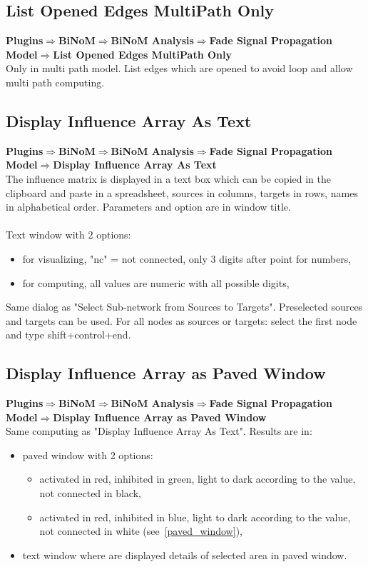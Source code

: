 \subsection{List Opened Edges MultiPath Only}
\textbf{Plugins$\Rightarrow$BiNoM$\Rightarrow$BiNoM Analysis$\Rightarrow$Fade Signal Propagation Model$\Rightarrow$List Opened Edges MultiPath Only}\\
Only in multi path model. List edges which are opened to avoid loop and allow multi path computing.

\subsection{Display Influence Array As Text}
\textbf{Plugins$\Rightarrow$BiNoM$\Rightarrow$BiNoM Analysis$\Rightarrow$Fade Signal Propagation Model$\Rightarrow$Display Influence Array As Text}\\
The influence matrix is displayed in a text box which can be copied in the clipboard and paste in a spreadsheet, sources in columns, targets in rows, names in alphabetical order. Parameters and option are in window title.\\\\
Text window with 2 options: 
\begin{itemize}
\item for visualizing, "nc" = not connected, only 3 digits after point for numbers,
\item for computing,  all values are numeric with all possible digits,
\end{itemize}
Same dialog as "Select Sub-network from Sources to Targets".  Preselected sources and targets can be used.  For all nodes as sources or targets: select the first node and type shift+control+end.

\subsection{Display Influence Array as Paved Window}
\textbf{Plugins$\Rightarrow$BiNoM$\Rightarrow$BiNoM Analysis$\Rightarrow$Fade Signal Propagation Model$\Rightarrow$Display Influence Array as Paved Window}\\
Same computing as "Display Influence Array As Text". Results are in:
\begin{itemize}
\item paved window with 2 options: 
\begin{itemize}
\item activated in red, inhibited in green, light to dark according to the value, not connected in black,
\item activated in red, inhibited in blue, light to dark according to the value, not connected in white (see~\ref{paved_window}),
\end{itemize}
\item text window where are displayed details of selected area in paved window.
\end{itemize}


